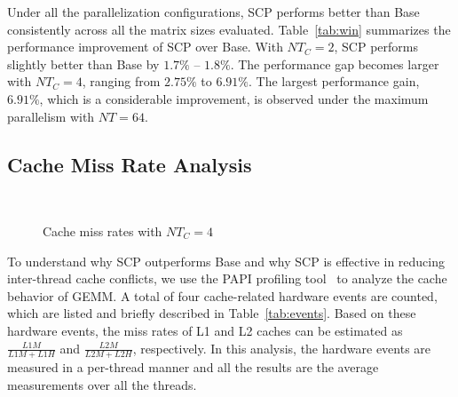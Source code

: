 Under all the parallelization configurations, 
SCP performs better than Base
consistently across all the matrix sizes evaluated.
Table~\ref{tab:win} summarizes the performance improvement of SCP over Base.
With $NT_C=2$, SCP performs slightly better than Base
by $1.7\%$ -- $1.8\%$.
The performance gap becomes larger with $NT_C=4$,
ranging from $2.75\%$ to $6.91\%$.
The largest performance gain, $6.91\%$, which is a considerable improvement,
is observed under the maximum parallelism with $NT=64$.



\subsection{Cache Miss Rate Analysis}\label{subsec:analysis}

\begin{figure}
  \centering
  \\
  \caption{Cache miss rates with $NT_C=4$}
  \label{fig:papi}
\end{figure}

To understand why SCP outperforms Base and
why SCP is effective in reducing
inter-thread cache conflicts, 
we use the PAPI profiling tool~\cite{papi} to
analyze the cache behavior of GEMM. A total of 
four cache-related hardware events are counted,
which are listed and briefly described in Table~\ref{tab:events}.
Based on these hardware events, the
miss rates of L1 and L2 caches can be estimated  as 
$\frac{L1M}{L1M+L1H}$ and $\frac{L2M}{L2M+L2H}$, respectively.
In this analysis,
the hardware events are measured in a per-thread manner
and all the results are the average measurements
over all the threads.

